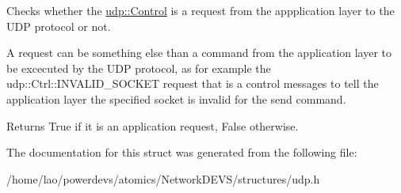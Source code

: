 Checks whether the \hyperlink{structudp_1_1Control}{udp\+::\+Control} is a request from the appplication layer to the U\+DP protocol or not. 

A request can be something else than a command from the application layer to be excecuted by the U\+DP protocol, as for example the udp\+::\+Ctrl\+::\+I\+N\+V\+A\+L\+I\+D\+\_\+\+S\+O\+C\+K\+ET request that is a control messages to tell the application layer the specified socket is invalid for the send command.

\begin{DoxyReturn}{Returns}
True if it is an application request, False otherwise. 
\end{DoxyReturn}


The documentation for this struct was generated from the following file\+:\begin{DoxyCompactItemize}
\item 
/home/lao/powerdevs/atomics/\+Network\+D\+E\+V\+S/structures/udp.\+h\end{DoxyCompactItemize}

